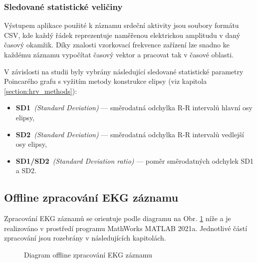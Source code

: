\subsubsection{Sledované statistické veličiny}
\label{section:selected_stats_vals}
Výstupem aplikace použité k záznamu srdeční aktivity jsou soubory formátu CSV,
kde každý řádek reprezentuje naměřenou elektrickou amplitudu v daný časový
okamžik. Díky znalosti vzorkovací frekvence zařízení lze snadno ke každému
záznamu vypočítat časový vektor a pracovat tak v časové oblasti.

V závislosti na studii byly vybrány následující sledované statistické parametry
Poincarého grafu s vyžitím metody konstrukce elipsy (viz kapitola
\ref{section:hrv_methods}):

\begin{itemize}
    \item \textbf{SD1}~\textit{(Standard Deviation)} --- směrodatná odchylka R-R
          intervalů hlavní osy elipsy,
    \item \textbf{SD2}~\textit{(Standard Deviation)} --- směrodatná odchylka R-R
          intervalů vedlejší osy elipsy,
    \item \textbf{SD1/SD2}~\textit{(Standard Deviation ratio)} --- poměr směrodatných odchylek SD1 a SD2.
\end{itemize}

\subsection{Offline zpracování EKG záznamu}
\label{section:offline_processing}
Zpracování EKG záznamů se orientuje podle diagramu na Obr.
\ref{fig:diagram_offline_processing} níže a je realizováno v prostředí programu
MathWorks MATLAB 2021a. Jednotlivé částí zpracování jsou rozebrány v
následujících kapitolách.

\begin{figure}[H]
    \centering
    \caption{Diagram offline zpracování EKG záznamu}
    \label{fig:diagram_offline_processing}
\end{figure}

